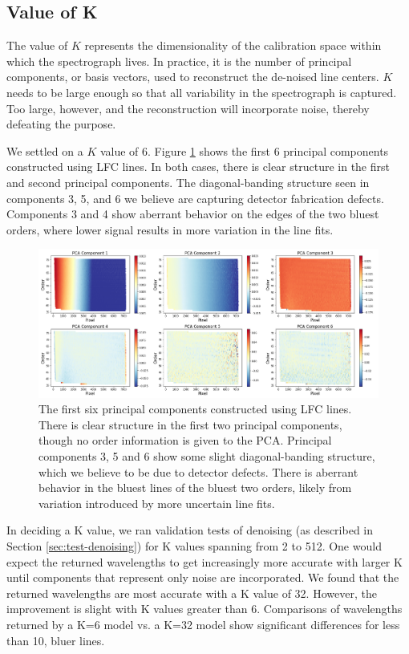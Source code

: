\documentclass[twocolumn]{aastex63}
\begin{document}
\subsection{Value of K}
The value of $K$ represents the dimensionality of the calibration space within which the spectrograph lives.  In practice, it is the number of principal components, or basis vectors, used to reconstruct the de-noised line centers.  $K$ needs to be large enough so that all variability in the spectrograph is captured.  Too large, however, and the reconstruction will incorporate noise, thereby defeating the purpose.

We settled on a $K$ value of 6.  Figure \ref{fig:pcLfc} shows the first 6 principal components constructed using LFC lines.  In both cases, there is clear structure in the first and second principal components.  The diagonal-banding structure seen in components 3, 5, and 6 we believe are capturing detector fabrication defects.  Components 3 and 4 show aberrant behavior on the edges of the two bluest orders, where lower signal results in more variation in the line fits.

\begin{figure}[t]
\centering
\includegraphics[width=\textwidth]{Figures/pcsLfc6.png}
\caption{The first six principal components constructed using LFC lines.  There is clear structure in the first two principal components, though no order information is given to the PCA.  Principal components 3, 5 and 6 show some slight diagonal-banding structure, which we believe to be due to detector defects.  There is aberrant behavior in the bluest lines of the bluest two orders, likely from variation introduced by more uncertain line fits.}
\label{fig:pcLfc}
\end{figure}

In deciding a K value, we ran validation tests of denoising (as described in Section \ref{sec:test-denoising}) for K values spanning from 2 to 512.  One would expect the returned wavelengths to get increasingly more accurate with larger K until components that represent only noise are incorporated.  We found that the returned wavelengths are most accurate with a K value of 32.  However, the improvement is slight with K values greater than 6.  Comparisons of wavelengths returned by a K=6 model vs. a K=32 model show significant differences for less than 10, bluer lines.
\end{document}
